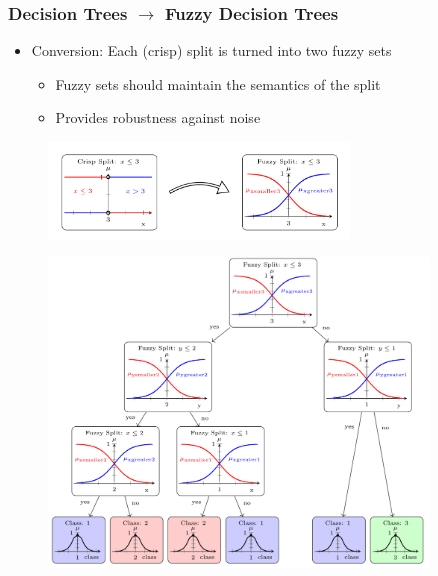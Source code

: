 \documentclass[
	10pt,
	t		%
]{beamer}
\begin{document}
\begin{frame}
	\frametitle{Decision Trees $\rightarrow$ Fuzzy Decision Trees}
	
	\begin{itemize}
		\item Conversion: Each (crisp) split is turned into two fuzzy sets
		      \begin{itemize}
			      \item Fuzzy sets should maintain the semantics of the split
			      \item Provides robustness against noise
		      \end{itemize}
	\end{itemize}
	
	\begin{figure}
		\centering
		\includegraphics[width=8cm]{figures/leaf-conversion.png}
	\end{figure}
	
\end{frame}

\begin{frame}

	\begin{figure}
		\centering
		\includegraphics[width=0.9\textwidth]{figures/fuzzy-decision-tree.png}
	\end{figure}
	
\end{frame}
\end{document}
